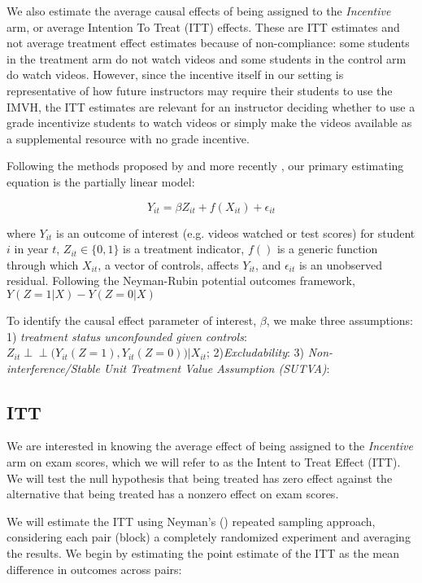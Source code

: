\documentclass[12pt]{article}
\begin{document}
We also estimate the average causal effects of being assigned to the \textit{Incentive} arm, or average Intention To Treat (ITT) effects. These are ITT estimates and not average treatment effect estimates because of non-compliance: some students in the treatment arm do not watch videos and some students in the control arm do watch videos. However, since the incentive itself in our setting is representative of how future instructors may require their students to use the IMVH, the ITT estimates are relevant for an instructor deciding whether to use a grade incentivize students to watch videos or simply make the videos available as a supplemental resource with no grade incentive.

Following the methods proposed by \textcite{robinson1988} and more recently \textcite{wa2018}, our primary estimating equation is the partially linear model:

\begin{equation}
	Y_{it} = \beta Z_{it} + f(X_{it}) + \epsilon_{it}
\end{equation}

where $Y_{it}$ is an outcome of interest (e.g. videos watched or test scores) for student $i$ in year $t$, $Z_{it} \in \{0,1\}$ is a treatment indicator, $f()$ is a generic function through which $X_{it}$, a vector of controls, affects $Y_{it}$, and $\epsilon_{it}$ is an unobserved residual. Following the Neyman-Rubin potential outcomes framework, $Y(Z=1|X) - Y(Z=0|X)$

To identify the causal effect parameter of interest, $\beta$, we make three assumptions: 1) \textit{treatment status unconfounded given controls}: $Z_{it} \perp \!\!\! \perp \Big(Y_{it}(Z=1), Y_{it}(Z=0)\Big) \Big| X_{it}$; 2)\textit{Excludability}: 3) \textit{Non-interference/Stable Unit Treatment Value Assumption (SUTVA)}:



\subsection{ITT}

We are interested in knowing the average effect of being assigned to the \textit{Incentive} arm on exam scores, which we will refer to as the Intent to Treat Effect (ITT). We will test the null hypothesis that being treated has zero effect against the alternative that being treated has a nonzero effect on exam scores. %

We will estimate the ITT using Neyman's (\citeyear{neyman1923}) repeated sampling approach, considering each pair (block) a completely randomized experiment and averaging the results. We begin by estimating the point estimate of the ITT as the mean difference in outcomes across pairs:
\end{document}
